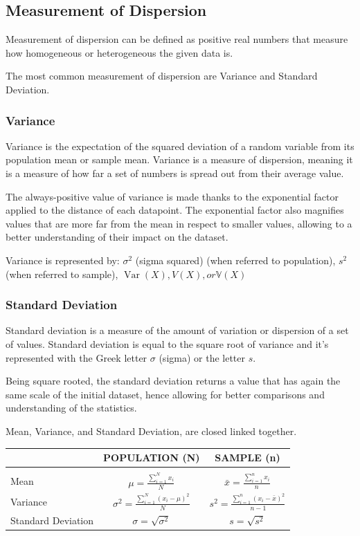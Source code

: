 \documentclass{article}
\begin{document}
\subsection{Measurement of Dispersion}
Measurement of dispersion can be defined as positive real numbers that measure how homogeneous or heterogeneous the given data is. 

The most common measurement of dispersion are Variance and Standard Deviation. 

\subsubsection{Variance}
Variance is the expectation of the squared deviation of a random variable from its population mean or sample mean. Variance is a measure of dispersion, meaning it is a measure of how far a set of numbers is spread out from their average value. 

The always-positive value of variance is made thanks to the exponential factor applied to the distance of each datapoint. 
The exponential factor also magnifies values that are more far from the mean in respect to smaller values, allowing to a better understanding of their impact on the dataset. 

Variance is represented by: $\sigma ^{2}$ (sigma squared) (when referred to population), ${\displaystyle s^{2}}$ (when referred to sample), ${\displaystyle \operatorname {Var} (X)}, {\displaystyle V(X)}, or {\displaystyle \mathbb {V} (X)}$

\subsubsection{Standard Deviation}
Standard deviation is a measure of the amount of variation or dispersion of a set of values. Standard deviation is equal to the square root of variance and it’s represented with the Greek letter $\sigma$ (sigma) or the letter $s$.

Being square rooted, the standard deviation returns a value that has again the same scale of the initial dataset, hence allowing for better comparisons and understanding of the statistics. 

Mean, Variance, and Standard Deviation, are closed linked together. 

\begin{center}
\begin{tabular}{|m{2cm}|c|c|}
\hline
& POPULATION (N) & SAMPLE (n) \\ \hline
&&\\[-1em]
Mean & $\displaystyle \mu = \frac{\sum\limits _{i=1}^{N} x_{i}}{N}$ & $\displaystyle \bar{x} = \frac{\sum\limits _{i=1}^{n} x_{i}}{n}$ \\[25pt]
Variance & $\displaystyle \sigma^2 = \frac{\sum\limits _{i=1}^{N} (x_{i} - \mu)^2}{N}$ & $\displaystyle s^2 = \frac{\sum\limits _{i=1}^{n} (x_{i} - \bar{x})^2}{n-1}$ \\[25pt]
Standard Deviation & $\displaystyle \sigma = \sqrt{\sigma^2}$ & $\displaystyle s = \sqrt{s^2}$ \\[25pt] 
\hline
\end{tabular}
\end{center}
\end{document}
